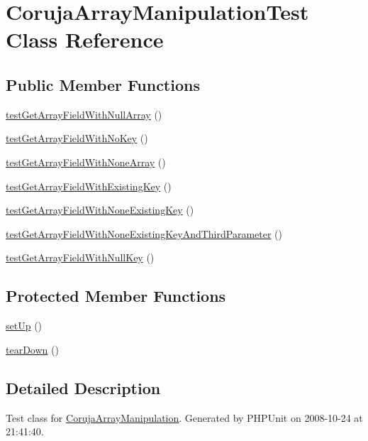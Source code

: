 \hypertarget{class_coruja_array_manipulation_test}{
\section{CorujaArrayManipulationTest Class Reference}
\label{class_coruja_array_manipulation_test}
}
\subsection*{Public Member Functions}
\begin{CompactItemize}
\item 
\hyperlink{class_coruja_array_manipulation_test_78b308f298161af48c3887029536a731}{testGetArrayFieldWithNullArray} ()
\item 
\hyperlink{class_coruja_array_manipulation_test_8399ad4b91876142e2d69ba6077c04eb}{testGetArrayFieldWithNoKey} ()
\item 
\hyperlink{class_coruja_array_manipulation_test_48ada181c4be1fc27b5b5542599ac884}{testGetArrayFieldWithNoneArray} ()
\item 
\hyperlink{class_coruja_array_manipulation_test_2b39098a7334b209f5e54877bf165e9b}{testGetArrayFieldWithExistingKey} ()
\item 
\hyperlink{class_coruja_array_manipulation_test_f87353adad0450eaa29c202a0b132262}{testGetArrayFieldWithNoneExistingKey} ()
\item 
\hyperlink{class_coruja_array_manipulation_test_9e14aea717bc3184296db73c59340944}{testGetArrayFieldWithNoneExistingKeyAndThirdParameter} ()
\item 
\hyperlink{class_coruja_array_manipulation_test_ea02b7a01e6a9cd620b4848be8559b7a}{testGetArrayFieldWithNullKey} ()
\end{CompactItemize}
\subsection*{Protected Member Functions}
\begin{CompactItemize}
\item 
\hyperlink{class_coruja_array_manipulation_test_0bc688732d2b3b162ffebaf7812e78da}{setUp} ()
\item 
\hyperlink{class_coruja_array_manipulation_test_80fe3d17e658907fc75346a0ec9d6fc7}{tearDown} ()
\end{CompactItemize}


\subsection{Detailed Description}
Test class for \hyperlink{class_coruja_array_manipulation}{CorujaArrayManipulation}. Generated by PHPUnit on 2008-10-24 at 21:41:40. 

